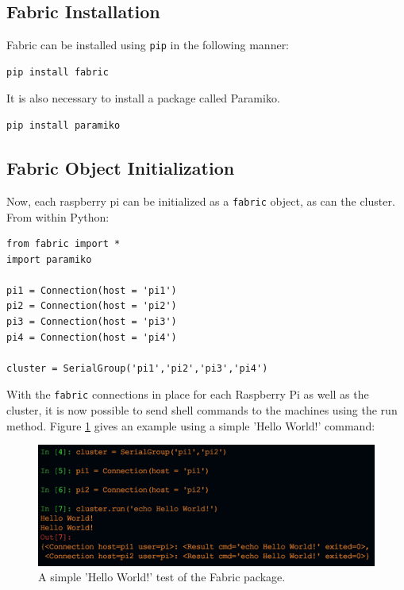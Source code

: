 \documentclass[sigconf]{acmart}
\begin{document}
\subsection{Fabric Installation}

Fabric can be installed using {\tt pip} in the following manner:

\begin{lstlisting}
pip install fabric
\end{lstlisting}
It is also necessary to install a package called Paramiko.
\begin{lstlisting}
pip install paramiko
\end{lstlisting}

\subsection{Fabric Object Initialization}

Now, each raspberry pi can be initialized as a {\tt fabric} object, as can the cluster. From within Python:

\begin{lstlisting}
from fabric import *
import paramiko

pi1 = Connection(host = 'pi1')
pi2 = Connection(host = 'pi2')
pi3 = Connection(host = 'pi3')
pi4 = Connection(host = 'pi4')

cluster = SerialGroup('pi1','pi2','pi3','pi4')

\end{lstlisting}

With the {\tt fabric} connections in place for each Raspberry Pi as well as the cluster, it is now possible to send shell 
commands to the machines using the run method. Figure \ref{f:fabricTest} gives an example using a simple 'Hello World!' 
command:

\begin{figure}[!ht]
  \centering\includegraphics[width=\columnwidth]{images/fabricTest.png}
  \caption{A simple 'Hello World!' test of the Fabric package.}\label{f:fabricTest}
\end{figure}
\end{document}

